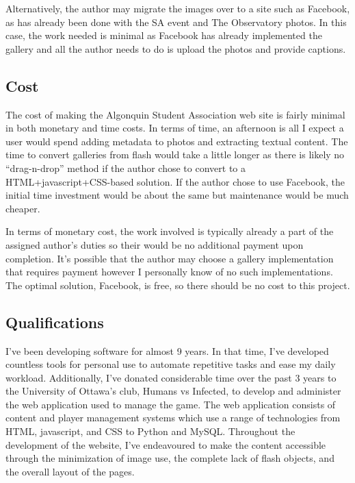 \documentclass[]{article}
\begin{document}
Alternatively, the author may migrate the images over to a site such as
Facebook, as has already been done with the SA event and The Observatory
photos. In this case, the work needed is minimal as Facebook has already
implemented the gallery and all the author needs to do is upload the
photos and provide captions.

\subsection{Cost}\label{cost}

The cost of making the Algonquin Student Association web site is fairly
minimal in both monetary and time costs. In terms of time, an afternoon
is all I expect a user would spend adding metadata to photos and
extracting textual content. The time to convert galleries from flash
would take a little longer as there is likely no ``drag-n-drop'' method
if the author chose to convert to a HTML+javascript+CSS-based solution.
If the author chose to use Facebook, the initial time investment would
be about the same but maintenance would be much cheaper.

In terms of monetary cost, the work involved is typically already a part
of the assigned author's duties so their would be no additional payment
upon completion. It's possible that the author may choose a gallery
implementation that requires payment however I personally know of no
such implementations. The optimal solution, Facebook, is free, so there
should be no cost to this project.

\subsection{Qualifications}\label{qualifications}

I've been developing software for almost 9 years. In that time, I've
developed countless tools for personal use to automate repetitive tasks
and ease my daily workload. Additionally, I've donated considerable time
over the past 3 years to the University of Ottawa's club, Humans vs
Infected, to develop and administer the web application used to manage
the game. The web application consists of content and player management
systems which use a range of technologies from HTML, javascript, and CSS
to Python and MySQL. Throughout the development of the website, I've
endeavoured to make the content accessible through the minimization of
image use, the complete lack of flash objects, and the overall layout of
the pages.
\end{document}
